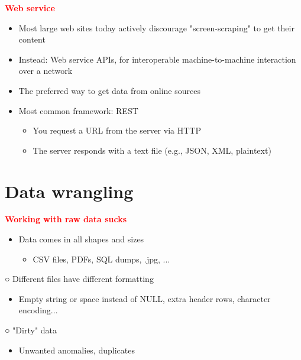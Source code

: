 \documentclass[11pt]{article}
\begin{document}
\vspace{0.5cm}

\textbf{\textcolor{red}{Web service}}

\begin{itemize}
	\item Most large web sites today actively discourage "screen-scraping" to get their content
	\item Instead: Web service APIs, for interoperable machine-to-machine interaction over a network
	\item The preferred way to get data from online sources
	\item Most common framework: REST
	\begin{itemize}
		\item You request a URL from the server via HTTP
		\item The server responds with a text file (e.g., JSON, XML, plaintext)
	\end{itemize}
\end{itemize}

\vspace{1cm}

\section*{Data wrangling}

\textbf{\textcolor{red}{Working with raw data sucks}}

\begin{itemize}
	\item Data comes in all shapes and sizes
	\begin{itemize}
		\item CSV files, PDFs, SQL dumps, .jpg, ...
	\end{itemize}
\end{itemize}

\begin{itemize}
        ○ Different files have different formatting
        \begin{itemize}
		\item Empty string or space instead of NULL, extra header rows, character encoding...
        \end{itemize}
\end{itemize}

\begin{itemize}
        ○ "Dirty" data
        \begin{itemize}
		\item Unwanted anomalies, duplicates
        \end{itemize}
\end{itemize}
\end{document}
